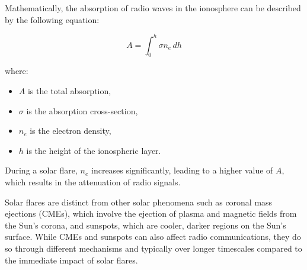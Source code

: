 Mathematically, the absorption of radio waves in the ionosphere can be described by the following equation:

\[
A = \int_{0}^{h} \sigma n_e \, dh
\]

where:
\begin{itemize}
    \item \( A \) is the total absorption,
    \item \( \sigma \) is the absorption cross-section,
    \item \( n_e \) is the electron density,
    \item \( h \) is the height of the ionospheric layer.
\end{itemize}

During a solar flare, \( n_e \) increases significantly, leading to a higher value of \( A \), which results in the attenuation of radio signals.

Solar flares are distinct from other solar phenomena such as coronal mass ejections (CMEs), which involve the ejection of plasma and magnetic fields from the Sun’s corona, and sunspots, which are cooler, darker regions on the Sun’s surface. While CMEs and sunspots can also affect radio communications, they do so through different mechanisms and typically over longer timescales compared to the immediate impact of solar flares.

